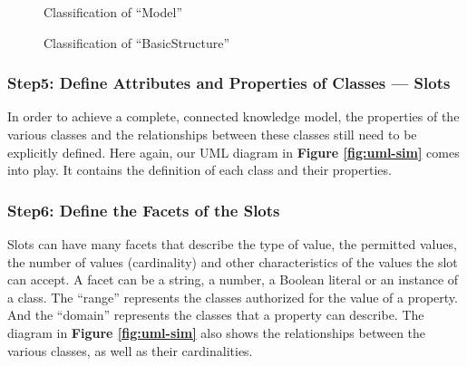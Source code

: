     \begin{figure}
        \centering
        \caption{\label{fig:classi-model} Classification of “Model”}
    \end{figure}
    
    \begin{figure}
        \centering
        \caption{\label{fig:classi-basic-struct} Classification of “BasicStructure”}
    \end{figure}
    

    
    \subsubsection{Step5: Define Attributes and Properties of Classes — Slots}
    In order to achieve a complete, connected knowledge model, the properties of the various classes and the relationships between these classes still need to be explicitly defined. Here again, our UML diagram in \textbf{Figure \ref{fig:uml-sim}} comes into play. It contains the definition of each class and their properties.
    
    
    \subsubsection{Step6: Define the Facets of the Slots}
    Slots can have many facets that describe the type of value, the permitted values, the number of values (cardinality) and other characteristics of the values the slot can accept. A facet can be a string, a number, a Boolean literal or an instance of a class. The “range” represents the classes authorized for the value of a property. And the “domain” represents the classes that a property can describe. The diagram in \textbf{Figure \ref{fig:uml-sim}} also shows the relationships between the various classes, as well as their cardinalities.
    
